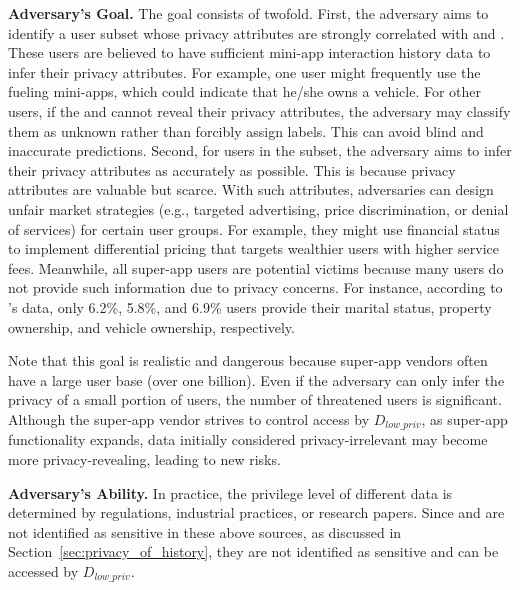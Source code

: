 \noindent \textbf{Adversary's Goal.}
The goal consists of twofold. 
% 
First, the adversary aims to identify a user subset whose privacy attributes are strongly correlated with \mini and \op. These users are believed to have sufficient mini-app interaction history data to
infer their privacy attributes. 
For example, one user might frequently use the fueling mini-apps, which could indicate that he/she owns a vehicle.
For other users, if the \mini and \op cannot reveal their privacy attributes, the adversary may classify them as unknown rather than forcibly assign labels. This can avoid blind and inaccurate predictions.
% 
Second, for users in the subset, the adversary aims to infer their privacy attributes as accurately as possible. This is because privacy attributes are valuable but scarce. With such attributes, adversaries can design unfair market strategies (e.g., targeted advertising, price discrimination, or denial of services) for certain user groups. For example, they might use financial status to implement differential pricing that targets wealthier users with higher service fees. Meanwhile, all super-app users are potential victims because many users do not provide such information due to privacy concerns. For instance, according to \alipay's data, only 6.2\%, 5.8\%, and 6.9\% users provide their marital status, property ownership, and vehicle ownership, respectively. 




Note that this goal is
realistic and dangerous because super-app vendors often have a large
user base (over one billion). Even if the adversary can only infer the privacy of
a small portion of users, the number of threatened users is significant. Although the super-app vendor strives to control access by $D_{low\_priv}$, as super-app functionality expands, data initially considered privacy-irrelevant may become more privacy-revealing, leading to new risks.


\noindent \textbf{Adversary's Ability.}
 In practice, the privilege level of different data is determined by regulations, industrial practices, or research papers. Since \mini and \op are not identified as sensitive in these above sources, as discussed in Section~\ref{sec:privacy_of_history}, they are not identified as sensitive and can be accessed by $D_{low\_priv}$.



